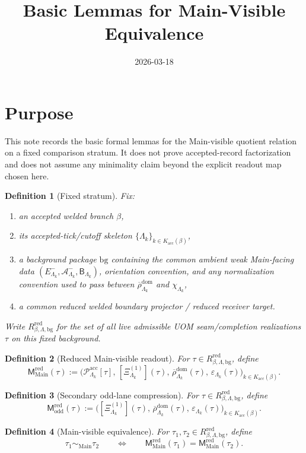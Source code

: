 \documentclass[11pt]{article}
\title{Basic Lemmas for Main-Visible Equivalence}
\date{2026-03-18}
\newtheorem{definition}{Definition}
\newcommand{\RMain}{R^{\mathrm{red}}_{\beta,\Lambda,\mathrm{bg}}}
\newcommand{\MMain}{\mathsf M^{\mathrm{red}}_{\mathrm{Main}}}
\newcommand{\MOdd}{\mathsf M^{\mathrm{red}}_{\mathrm{odd}}}
\newcommand{\XiOne}{\Xi^{(1)}}
\newcommand{\rhobar}{\overline{\rho}^{\mathrm{dom}}}
\begin{document}
\maketitle

\section*{Purpose}

This note records the basic formal lemmas for the Main-visible quotient relation on a fixed
comparison stratum. It does not prove accepted-record factorization and does not assume any
minimality claim beyond the explicit readout map chosen here.

\begin{definition}[Fixed stratum]
Fix:
\begin{enumerate}
\item an accepted welded branch \(\beta\),
\item its accepted-tick/cutoff skeleton \(\{\Lambda_k\}_{k\in K_{\mathrm{acc}}(\beta)}\),
\item a background package \(\mathrm{bg}\) containing the common ambient weak Main-facing data
  \((E^-_{\Lambda_k},\mathcal A^-_{\Lambda_k},\mathsf B_{\Lambda_k})\), orientation convention, and
  any normalization convention used to pass between \(\rhobar_{\Lambda_k}\) and \(\chi_{\Lambda_k}\),
\item a common reduced welded boundary projector / reduced receiver target.
\end{enumerate}
Write \(\RMain\) for the set of all live admissible UOM seam/completion realizations \(\tau\) on this
fixed background.
\end{definition}

\begin{definition}[Reduced Main-visible readout]
For \(\tau\in\RMain\), define
\[
\MMain(\tau)
:=
\Big(
\mathcal P^{\mathrm{acc}}_{\Lambda_k}[\tau],\,
[\XiOne_{\Lambda_k}](\tau),\,\rhobar_{\Lambda_k}(\tau),\,\varepsilon_{\Lambda_k}(\tau)
\Big)_{k\in K_{\mathrm{acc}}(\beta)}.
\]
\end{definition}

\begin{definition}[Secondary odd-lane compression]
For \(\tau\in\RMain\), define
\[
\MOdd(\tau)
:=
\Big(
[\XiOne_{\Lambda_k}](\tau),\,\rhobar_{\Lambda_k}(\tau),\,\varepsilon_{\Lambda_k}(\tau)
\Big)_{k\in K_{\mathrm{acc}}(\beta)}.
\]
\end{definition}

\begin{definition}[Main-visible equivalence]
For \(\tau_1,\tau_2\in\RMain\), define
\[
\tau_1 \sim_{\mathrm{Main}} \tau_2
\qquad\Longleftrightarrow\qquad
\MMain(\tau_1)=\MMain(\tau_2).
\]
\end{definition}
\end{document}
